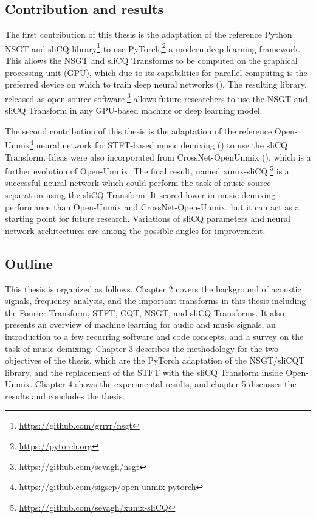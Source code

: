 \documentclass[report.tex]{subfiles}
\begin{document}
\subsection{Contribution and results}

The first contribution of this thesis is the adaptation of the reference Python NSGT and sliCQ library\footnote{\url{https://github.com/grrrr/nsgt}} to use PyTorch,\footnote{\url{https://pytorch.org}} a modern deep learning framework. This allows the NSGT and sliCQ Transforms to be computed on the graphical processing unit (GPU), which due to its capabilities for parallel computing is the preferred device on which to train deep neural networks (\cite{pytorch}). The resulting library, released as open-source software,\footnote{\url{https://github.com/sevagh/nsgt}} allows future researchers to use the NSGT and sliCQ Transform in any GPU-based machine or deep learning model.

The second contribution of this thesis is the adaptation of the reference Open-Unmix\footnote{\url{https://github.com/sigsep/open-unmix-pytorch}} neural network for STFT-based music demixing (\cite{umx}) to use the sliCQ Transform. Ideas were also incorporated from CrossNet-OpenUnmix (\cite{xumx}), which is a further evolution of Open-Unmix. The final result, named xumx-sliCQ,\footnote{\url{https://github.com/sevagh/xumx-sliCQ}} is a successful neural network which could perform the task of music source separation using the sliCQ Transform. It scored lower in music demixing performance than Open-Unmix and CrossNet-Open-Unmix, but it can act as a starting point for future research. Variations of sliCQ parameters and neural network architectures are among the possible angles for improvement.

\subsection{Outline}

This thesis is organized as follows. Chapter 2 covers the background of acoustic signals, frequency analysis, and the important transforms in this thesis including the Fourier Transform, STFT, CQT, NSGT, and sliCQ Transforms. It also presents an overview of machine learning for audio and music signals, an introduction to a few recurring software and code concepts, and a survey on the task of music demixing. Chapter 3 describes the methodology for the two objectives of the thesis, which are the PyTorch adaptation of the NSGT/sliCQT library, and the replacement of the STFT with the sliCQ Transform inside Open-Unmix. Chapter 4 shows the experimental results, and chapter 5 discusses the results and concludes the thesis.
\end{document}

